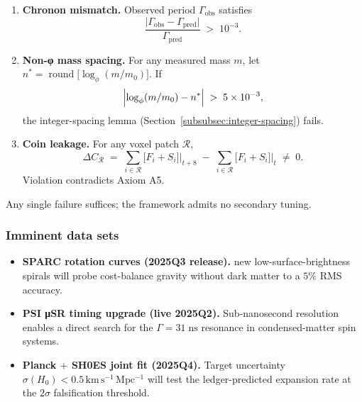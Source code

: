 \documentclass[11pt,oneside]{book}
\begin{document}
\begin{enumerate}[label=\textbf{F\arabic*:}, leftmargin=3em]
  \item \textbf{Chronon mismatch.}\;
        Observed period \(\Gamma_{\text{obs}}\) satisfies
        \[
          \frac{\lvert\Gamma_{\text{obs}}-\Gamma_{\text{pred}}\rvert}
               {\Gamma_{\text{pred}}}
          \;>\;10^{-3}.
        \]
  \item \textbf{Non-φ mass spacing.}\;
        For any measured mass \(m\),
        let \(n^{\ast}=\operatorname*{round}\!\bigl[\log_{\phi}(m/m_{0})\bigr]\).
        If
        \[
          \Bigl\lvert\log_{\phi}(m/m_{0})-n^{\ast}\Bigr\rvert
          \;>\;5\times10^{-3},
        \]
        the integer-spacing lemma
        (Section~\ref{subsubsec:integer-spacing}) fails.
  \item \textbf{Coin leakage.}\;
        For any voxel patch \(\mathcal{R}\),
        \[
          \Delta C_{\mathcal{R}}
            \;=\;
            \sum_{i\in\mathcal{R}}
            \bigl[F_{i}+S_{i}\bigr]\Big|_{t+8}
            \;-\;
            \sum_{i\in\mathcal{R}}
            \bigl[F_{i}+S_{i}\bigr]\Big|_{t}
          \;\neq\;0.
        \]
        Violation contradicts Axiom A5.
\end{enumerate}

Any single failure suffices; the framework admits no secondary tuning.

\subsubsection{Imminent data sets}
\label{subsubsec:data-sets}
\begin{itemize}
  \item \textbf{SPARC rotation curves (2025Q3 release).} new low-surface-brightness spirals will probe
        cost-balance gravity without dark matter
        to a \(5\%\) RMS accuracy.
  \item \textbf{PSI μSR timing upgrade (live 2025Q2).}\;
        Sub-nanosecond resolution enables a direct
        search for the \(\Gamma = 31\;\text{ns}\) resonance
        in condensed-matter spin systems.
  \item \textbf{Planck $\boldsymbol{+}$ SH0ES joint fit (2025Q4).}\;
        Target uncertainty \(\sigma(H_{0})\!<\!0.5\,\mathrm{km\,s^{-1}\,Mpc^{-1}}\)
        will test the ledger-predicted expansion rate at the
        \(2\sigma\) falsification threshold.
\end{itemize}
\end{document}
